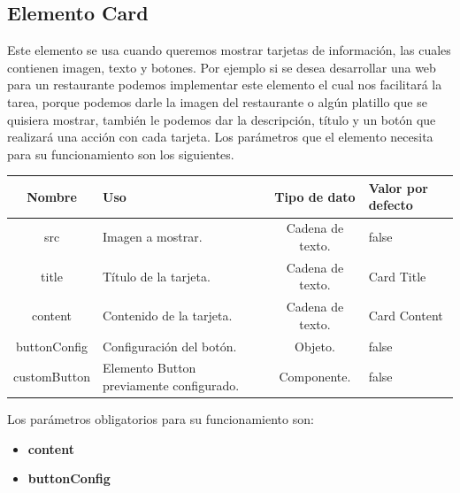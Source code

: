     \subsection{Elemento Card}
    Este elemento se usa cuando queremos mostrar tarjetas de información, las cuales contienen imagen, texto y botones. Por ejemplo si se desea desarrollar una web para un restaurante podemos implementar este elemento el cual nos facilitará la tarea, porque podemos darle la imagen del restaurante o algún platillo que se quisiera mostrar, también le podemos dar la descripción, título y un botón que realizará una acción con cada tarjeta.
Los parámetros que el elemento necesita para su funcionamiento son los siguientes.
\newline
    \newline
    \begin{center}
     \begin{tabular}{ | c |  p{5cm}  | c | p{3cm} |} 
     \hline
     \textbf{Nombre} &  \textbf{Uso} &  \textbf{ Tipo de dato} &  \textbf{Valor por defecto}\\ [0.5ex] 
     \hline\hline
     src &  Imagen a mostrar. &   Cadena de texto. &  false \\  [2.5ex] 
     \hline
      title & Título de la tarjeta. &   Cadena de texto. &  Card Title \\  [2.5ex] 
     \hline
     content & Contenido de la tarjeta. &   Cadena de texto. &  Card Content  \\  [2.5ex] 
     \hline
     buttonConfig &  Configuración del botón. &   Objeto. &  false \\  [2.5ex] 
     \hline
     customButton &  Elemento Button previamente configurado. &   Componente. &  false \\  [2.5ex] 
     \hline
    \end{tabular}
    \end{center}
    \newline
            \newline
Los parámetros obligatorios para su funcionamiento son:
\begin{itemize}
\item \textbf{content} 
\item \textbf{buttonConfig} 
\end{itemize}
\newline
    \newline
